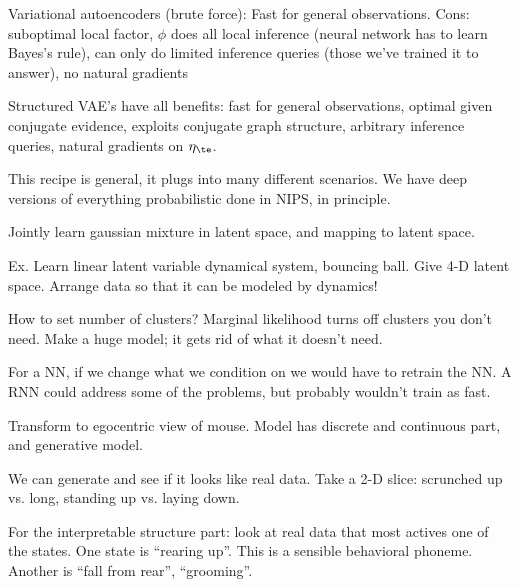 Variational autoencoders (brute force): Fast for general observations. Cons: suboptimal local factor, $\phi$ does all local inference (neural network has to learn Bayes's rule), can only do limited inference queries (those we've trained it to answer), no natural gradients

Structured VAE's have all benefits: fast for general observations, optimal given conjugate evidence, exploits conjugate graph structure, arbitrary inference queries, natural gradients on $\eta_\te$.

This recipe is general, it plugs into many different scenarios. We have deep versions of everything probabilistic done in NIPS, in principle.

Jointly learn gaussian mixture in latent space, and mapping to latent space.

Ex. Learn linear latent variable dynamical system, bouncing ball. Give 4-D latent space.
Arrange data so that it can be modeled by dynamics! %

How to set number of clusters? Marginal likelihood turns off clusters you don't need. Make a huge model; it gets rid of what it doesn't need.

For a NN, if we change what we condition on we would have to retrain the NN. A RNN could address some of the problems, but probably wouldn't train as fast.


Transform to egocentric view of mouse. Model has discrete and continuous part, and generative model. 

We can generate and see if it looks like real data.
Take a 2-D slice: scrunched up vs. long, standing up vs. laying down.

For the interpretable structure part:  look at real data that most actives one of the states. One state is ``rearing up''. This is a sensible behavioral phoneme. Another is ``fall from rear'', ``grooming''.

